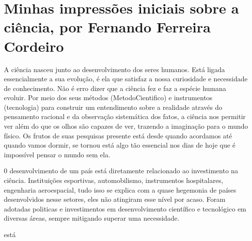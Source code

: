 \section{Minhas impressões iniciais sobre a ciência, por Fernando Ferreira Cordeiro}

A ciência nasceu junto ao desenvolvimento dos seres humanos. Está ligada essencialmente a sua evolução, é ela que satisfaz a nossa curiosidade e necessidade de conhecimento. Não é erro dizer que a ciência fez e faz a espécie humana evoluir. Por meio dos seus métodos (\gls{MetodoCientifico}) e instrumentos (\gls{tecnologia}) para construir um entendimento sobre a realidade através do pensamento racional e da observação sistemática dos fatos, a ciência nos permitir  ver além do que os olhos são capazes de ver, trazendo a imaginação para o mundo físico. Os frutos de suas pesquisas presente está  desde quando acordamos até quando vamos dormir, se tornou está  algo tão essencial nos dias de hoje que é impossível pensar o mundo sem ela. 

0 desenvolvimento de um país está diretamente relacionado ao investimento na ciência. Instituições esportivas, automobilismo, instrumentos hospitalares, engenharia aeroespacial, tudo isso se explica com a quase hegemonia de países desenvolvidos nesse setores, eles não atingiram esse nível por acaso. Foram adotadas politicas e investimentos em desenvolvimento científico e tecnológico em diversas áreas, sempre mitigando superar uma necessidade.       

está  